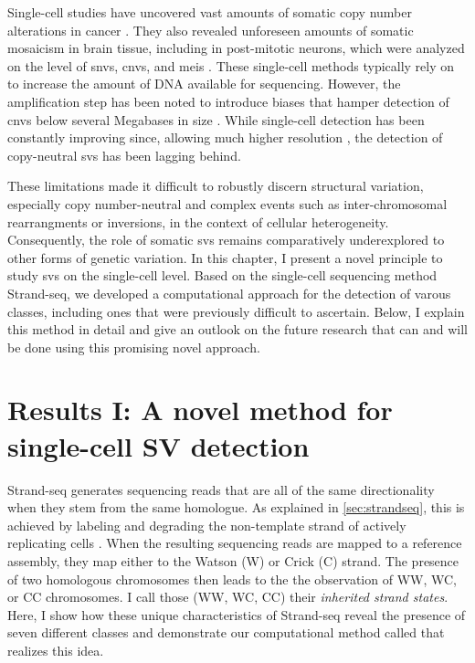 Single-cell studies have uncovered vast amounts of somatic copy number
alterations in cancer \citep{Navin2011,Demeulemeester2016}. They also revealed
unforeseen amounts of somatic mosaicism in brain tissue, including in
post-mitotic neurons, which were analyzed on the level of \acp{snv}, \acp{cnv},
and \acp{mei} \citep{Lodato2015,Cai2014,Evrony2012}.
These single-cell methods typically rely on 
to increase the amount of DNA available for sequencing. However, the amplification step has been noted to
introduce biases that hamper detection of \acp{cnv} below several Megabases in
size \citep{Deleye2017}. While single-cell \cnv detection has been
constantly improving since, allowing much higher resolution
\citep{Garvin2015,Gao2016,Bakker2016,Knouse2016}, the detection of copy-neutral \acp{sv} has
been lagging behind.

These limitations made it difficult to robustly discern structural variation,
especially copy number-neutral and complex events such as inter-chromosomal
rearrangments or inversions, in the context of cellular
heterogeneity. Consequently, the role of somatic \acp{sv} remains comparatively
underexplored to other forms of genetic variation. In this chapter, I present a
novel principle to study \acp{sv} on the single-cell level. Based on the
single-cell sequencing method Strand-seq, we developed a computational approach
for the detection of varous \sv classes, including ones that were previously
difficult to ascertain. Below, I
explain this method in detail and give an outlook on the future research that
can and will be done using this promising novel approach.






\section{Results I: A novel method for single-cell SV detection}
\label{sec:mosaic_mc}

Strand-seq generates sequencing reads that are all of the same directionality
when they stem from the same homologue. As explained in \cref{sec:strandseq},
this is achieved by labeling and degrading the non-template strand of
actively replicating cells \citep{Falconer2012,Sanders2017}. When the resulting sequencing reads are mapped to a
reference assembly, they map either to the Watson (W) or Crick (C) strand. The
presence of two homologous chromosomes then leads to the the observation of WW, WC, or CC
chromosomes. I call those (WW, WC, CC) their \emph{inherited strand states}.
Here, I show how these unique characteristics of Strand-seq reveal the presence
of seven different \sv classes and demonstrate our computational method called
\mc that realizes this idea.




